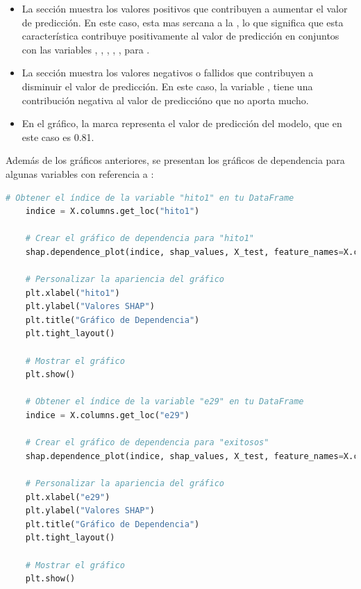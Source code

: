 \begin{itemize}
    \item La sección  muestra los valores positivos que contribuyen a aumentar el valor de predicción. En este caso,  esta mas sercana a la , lo que significa que esta característica contribuye positivamente al valor de predicción en conjuntos con las variables , , , , ,  para .
    \item La sección  muestra los valores negativos o fallidos que contribuyen a disminuir el valor de predicción. En este caso, la variable , tiene una contribución negativa al valor de prediccióno que no aporta mucho.
    \item En el gráfico, la marca  representa el valor de predicción del modelo, que en este caso es 0.81.
\end{itemize}

Además de los gráficos anteriores, se presentan los gráficos de dependencia para algunas variables con referencia a :

\begin{lstlisting}[language=Python, caption=Grafico de dependencia hito1  e29, label=lst:grafDepHito1e29]
    # Obtener el índice de la variable "hito1" en tu DataFrame
    indice = X.columns.get_loc("hito1")
    
    # Crear el gráfico de dependencia para "hito1"
    shap.dependence_plot(indice, shap_values, X_test, feature_names=X.columns, show=False)
    
    # Personalizar la apariencia del gráfico
    plt.xlabel("hito1")
    plt.ylabel("Valores SHAP")
    plt.title("Gráfico de Dependencia")
    plt.tight_layout()
    
    # Mostrar el gráfico
    plt.show()

    # Obtener el índice de la variable "e29" en tu DataFrame
    indice = X.columns.get_loc("e29")

    # Crear el gráfico de dependencia para "exitosos"
    shap.dependence_plot(indice, shap_values, X_test, feature_names=X.columns, show=False)

    # Personalizar la apariencia del gráfico
    plt.xlabel("e29")
    plt.ylabel("Valores SHAP")
    plt.title("Gráfico de Dependencia")
    plt.tight_layout()

    # Mostrar el gráfico
    plt.show()
\end{lstlisting}

